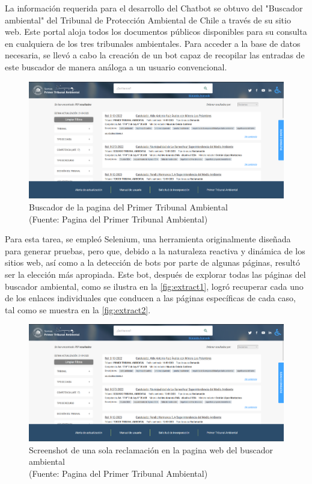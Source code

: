 
La información requerida para el desarrollo del Chatbot se obtuvo del "Buscador ambiental" del Tribunal de Protección Ambiental 
de Chile a través de su sitio web\cite{BuscadorAmbiental}. Este portal aloja todos los documentos públicos disponibles para su consulta en cualquiera 
de los tres tribunales ambientales. Para acceder a la base de datos necesaria, se llevó a cabo la creación de 
un bot capaz de recopilar las entradas de este buscador de manera análoga a un usuario convencional.

\begin{figure}[ht!]
    \centering
    \includegraphics[width=.8\textwidth]{figures/huemul2.png}
    \caption[Screenshot del Buscador de la pagina del Primer Tribunal Ambiental]{Buscador de la pagina del Primer Tribunal Ambiental\\
    {\scriptsize (Fuente: Pagina del Primer Tribunal Ambiental)}}
    \label{fig:extract1}
\end{figure}
    
Para esta tarea, se empleó Selenium, una herramienta originalmente diseñada para generar pruebas, pero que, debido a la naturaleza 
reactiva y dinámica de los sitios web, así como a la detección de bots por parte de algunas páginas, resultó ser la elección 
más apropiada. Este bot, después de explorar todas las páginas del buscador ambiental, como se ilustra en la \autoref{fig:extract1},
logró recuperar cada uno de los enlaces individuales que conducen a las páginas específicas de cada caso, tal como se 
muestra en la \autoref{fig:extract2}.

\begin{figure}[ht!]
    \centering
    \includegraphics[width=.8\textwidth]{figures/huemul2.png}
    \caption[Screenshot de una sola reclamación en la pagina web del buscador ambiental]{Screenshot de una sola reclamación en la pagina web del buscador ambiental\\
    {\scriptsize (Fuente: Pagina del Primer Tribunal Ambiental)}}
    \label{fig:extract2}
\end{figure}
    
